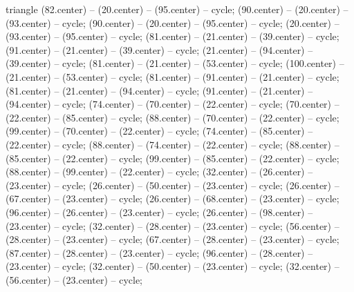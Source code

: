 \begin{pgfonlayer}{triangle}
 (82.center) -- (20.center) -- (95.center) -- cycle; 
 (90.center) -- (20.center) -- (93.center) -- cycle; 
 (90.center) -- (20.center) -- (95.center) -- cycle; 
 (20.center) -- (93.center) -- (95.center) -- cycle; 
 (81.center) -- (21.center) -- (39.center) -- cycle; 
 (91.center) -- (21.center) -- (39.center) -- cycle; 
 (21.center) -- (94.center) -- (39.center) -- cycle; 
 (81.center) -- (21.center) -- (53.center) -- cycle; 
 (100.center) -- (21.center) -- (53.center) -- cycle; 
 (81.center) -- (91.center) -- (21.center) -- cycle; 
 (81.center) -- (21.center) -- (94.center) -- cycle; 
 (91.center) -- (21.center) -- (94.center) -- cycle; 
 (74.center) -- (70.center) -- (22.center) -- cycle; 
 (70.center) -- (22.center) -- (85.center) -- cycle; 
 (88.center) -- (70.center) -- (22.center) -- cycle; 
 (99.center) -- (70.center) -- (22.center) -- cycle; 
 (74.center) -- (85.center) -- (22.center) -- cycle; 
 (88.center) -- (74.center) -- (22.center) -- cycle; 
 (88.center) -- (85.center) -- (22.center) -- cycle; 
 (99.center) -- (85.center) -- (22.center) -- cycle; 
 (88.center) -- (99.center) -- (22.center) -- cycle; 
 (32.center) -- (26.center) -- (23.center) -- cycle; 
 (26.center) -- (50.center) -- (23.center) -- cycle; 
 (26.center) -- (67.center) -- (23.center) -- cycle; 
 (26.center) -- (68.center) -- (23.center) -- cycle; 
 (96.center) -- (26.center) -- (23.center) -- cycle; 
 (26.center) -- (98.center) -- (23.center) -- cycle; 
 (32.center) -- (28.center) -- (23.center) -- cycle; 
 (56.center) -- (28.center) -- (23.center) -- cycle; 
 (67.center) -- (28.center) -- (23.center) -- cycle; 
 (87.center) -- (28.center) -- (23.center) -- cycle; 
 (96.center) -- (28.center) -- (23.center) -- cycle; 
 (32.center) -- (50.center) -- (23.center) -- cycle; 
 (32.center) -- (56.center) -- (23.center) -- cycle; 

\end{pgfonlayer}
